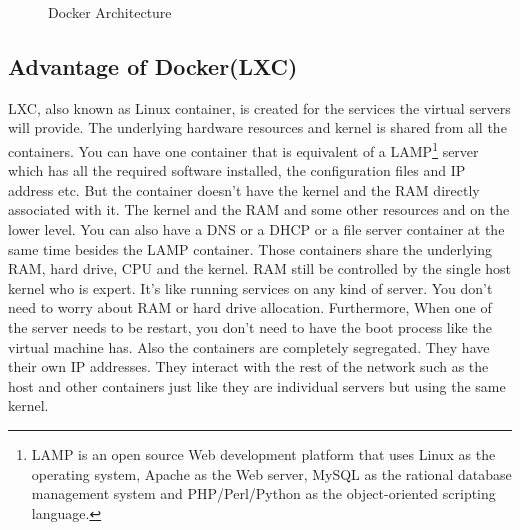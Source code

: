 \documentclass{sig-alternate}
\begin{document}
\begin{figure}[ht]
\centering
{}
\caption{Docker Architecture}
\label{fig:da}
\vskip -6pt
\end{figure}

\subsection{Advantage of Docker(LXC)}
LXC, also known as Linux container, is created for the services the virtual servers will provide. The underlying hardware resources and kernel is shared from all the containers. You can have one container that is equivalent of a LAMP\footnote{LAMP is an open source Web development platform that uses Linux as the operating system, Apache as the Web server, MySQL as the rational database management system and PHP/Perl/Python as the object-oriented scripting language.} server which has all the required software installed, the configuration files and IP address etc. But the container doesn't have the kernel and the RAM directly associated with it. The kernel and the RAM and some other resources and on the lower level. You can also have a DNS or a DHCP or a file server container at the same time besides the LAMP container. Those containers share the underlying RAM, hard drive, CPU and the kernel. RAM still be controlled by the single host kernel who is expert. It's like running services on any kind of server. You don't need to worry about RAM or hard drive allocation. Furthermore, When one of the server needs to be restart, you don't need to have the boot process like the virtual machine has. Also the containers are completely segregated. They have their own IP addresses. They interact with the rest of the network such as the host and other containers just like they are individual servers but using the same kernel. 
\end{document}
